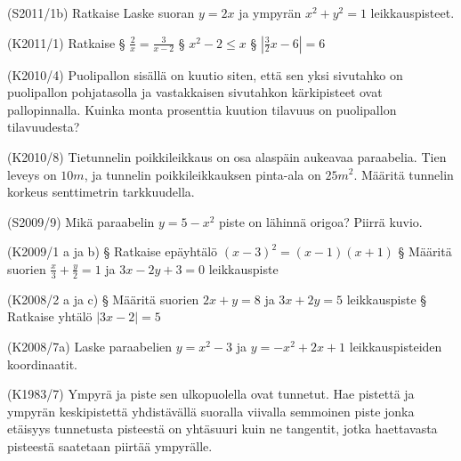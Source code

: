 \begin{tehtava} (S2011/1b) Ratkaise
Laske suoran $y=2x$ ja ympyrän $x^2+y^2=1$ leikkauspisteet.
\end{tehtava}

\begin{tehtava} (K2011/1) Ratkaise
  \alakohdat
		§ $\frac{2}{x}=\frac{3}{x-2}$
		§ $x^2-2\leq x$
		§ $\left|\frac{3}{2}x-6\right|=6$	
  \loppu
\end{tehtava}

\begin{tehtava}(K2010/4)
Puolipallon sisällä on kuutio siten, että sen yksi sivutahko on puolipallon pohjatasolla ja vastakkaisen sivutahkon kärkipisteet ovat pallopinnalla. Kuinka monta prosenttia kuution tilavuus on puolipallon tilavuudesta?
\end{tehtava}

\begin{tehtava}(K2010/8)
Tietunnelin poikkileikkaus on osa alaspäin aukeavaa paraabelia. Tien leveys on $10 m$, ja tunnelin poikkileikkauksen pinta-ala on $25 m^2$. Määritä tunnelin korkeus senttimetrin tarkkuudella.
\end{tehtava}


\begin{tehtava}(S2009/9)
Mikä paraabelin $y=5-x^2$ piste on lähinnä origoa? Piirrä kuvio.
\end{tehtava}

\begin{tehtava}(K2009/1 a ja b)
  \alakohdat
		§ Ratkaise epäyhtälö $(x-3)^2=(x-1)(x+1)$
		§ Määritä suorien $\frac{x}{3}+\frac{y}{2}=1$ ja $3x-2y+3=0$ leikkauspiste	
  \loppu
\end{tehtava}

\begin{tehtava} (K2008/2 a ja c)
  \alakohdat
		§ Määritä suorien $2x+y=8$ ja $3x+2y=5$ leikkauspiste
		§ Ratkaise yhtälö $|3x-2|=5$	
  \loppu
\end{tehtava}


\begin{tehtava}(K2008/7a)
Laske paraabelien $y=x^2-3$ ja $y=-x^2+2x+1$ leikkauspisteiden koordinaatit.
\end{tehtava}

\begin{tehtava}(K1983/7)
Ympyrä ja piste sen ulkopuolella ovat tunnetut. Hae pistettä ja ympyrän keskipistettä yhdistävällä suoralla viivalla semmoinen piste jonka etäisyys tunnetusta pisteestä on yhtäsuuri kuin ne tangentit, jotka haettavasta pisteestä saatetaan piirtää ympyrälle. 
\end{tehtava}


